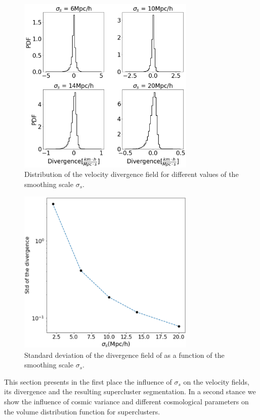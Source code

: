 \documentclass[usenatbib]{mnras}
\begin{document}
\begin{figure}
    \centering
    \includegraphics[width=240pt]{smooth_grad_dist.pdf}
    \caption{Distribution of the velocity divergence field
      for different values of the smoothing scale $\sigma_s$.}
    \label{fig:smooth_grad_dist}
\end{figure}



\begin{figure}
    \centering
    \includegraphics[width=240pt]{std_smooth.pdf}
    \caption{Standard deviation of the divergence field of
      as a function of the smoothing scale $\sigma_s$.}
    \label{fig:std_smooth}
\end{figure}


This section presents in the first place the influence of $\sigma_s$
on the velocity fields, its divergence and the resulting supercluster
segmentation. 
In a second stance we show the influence of cosmic variance and
different cosmological parameters on the volume distribution function
for superclusters. 
\end{document}
